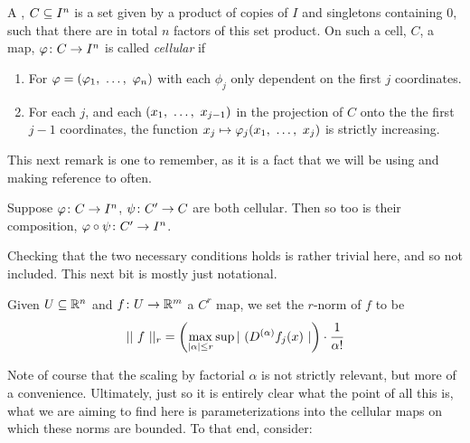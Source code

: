 \begin{definition}
  A \emph{\bc}, $\CIn[C]{n}$ is a set given by a product of copies of $I$ and singletons containing $0$, such that there are in total $n$ factors of this set product. On such a cell, $C$, a \cont map, $\funcdom{\phi}{C}{I^n}$ is called \emph{cellular} if
    \begin{enumerate}
      \item For $\phi = (\vonevm{\phi}{n})$ with each $\phi_j$ only dependent on the first $j$ coordinates.

      \item For each $j$, and each $(\vonevm{x}{j - 1})$ in the projection of $C$ onto the the first $j - 1$ coordinates, the function $x_j \mapsto \phi_j(\vonevm{x}{j})$ is strictly increasing.
    \end{enumerate}

\end{definition}

This next remark is one to remember, as it is a fact that we will be using and making reference to often.



\begin{remark}
  Suppose $\funcdom{\phi}{C}{I^n}$, $\funcdom{\psi}{\pri{C}}{C}$ are both cellular. Then so too is their composition, $\funcdom{\phi \circ \psi}{\pri{C}}{I^n}$.
\end{remark}
Checking that the two necessary conditions holds is rather trivial here, and so not included. This next bit is mostly just notational.

\begin{definition}
  Given $\XRn[U]{n}$ and $\funcdom{f}{U}{\R^m}$ a $C^r$ map, we set the $r$-norm of $f$ to be
    \begin{align*}
      \rnorm[r]{\ f \ } = \left( \max_{\abs{\alpha} \leq r}{ \sup{ \abs{ \ ( D^{(\alpha)} f_j(x) \ } } } \right) \cdot \cfrac{1}{\alpha !}
    \end{align*}
\end{definition}

Note of course that the scaling by factorial $\alpha$ is not strictly relevant, but more of a convenience. Ultimately, just so it is entirely clear what the point of all this is, what we are aiming to find here is parameterizations into the cellular maps on which these norms are bounded. To that end, consider:

